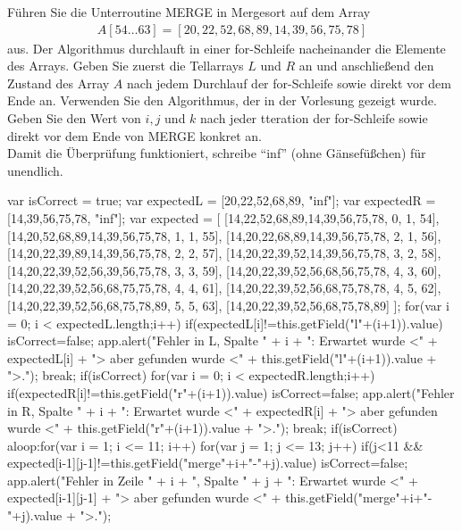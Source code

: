 \documentclass[a4paper,12pt]{article}
\begin{document}
\noindent Führen Sie die Unterroutine MERGE in Mergesort auf dem Array
\begin{align*}
    A[54 \ldots 63]=[20,22,52,68,89,14,39,56,75,78]
\end{align*}
aus. Der Algorithmus durchlauft in einer for-Schleife nacheinander die Elemente des Arrays. Geben Sie zuerst die
Tellarrays $L$ und $R$ an und anschließend den Zustand des Array $A$ nach jedem Durchlauf der for-Schleife sowie direkt
vor dem Ende an. Verwenden Sie den Algorithmus, der in der Vorlesung gezeigt wurde. Geben Sie den Wert von $i, j$
und $k$ nach jeder tteration der for-Schleife sowie direkt vor dem Ende von MERGE konkret an.\\
Damit die Überprüfung funktioniert, schreibe "`inf"' (ohne Gänsefüßchen) für unendlich.
\def\textfieldwidth{.8cm}
\begin{defineJS}{\aNiceScript}
    var isCorrect = true;
    var expectedL = [20,22,52,68,89, "inf"];
    var expectedR = [14,39,56,75,78, "inf"];
    var expected = [
        [14,22,52,68,89,14,39,56,75,78, 0, 1, 54],
        [14,20,52,68,89,14,39,56,75,78, 1, 1, 55],
        [14,20,22,68,89,14,39,56,75,78, 2, 1, 56],
        [14,20,22,39,89,14,39,56,75,78, 2, 2, 57],
        [14,20,22,39,52,14,39,56,75,78, 3, 2, 58],
        [14,20,22,39,52,56,39,56,75,78, 3, 3, 59],
        [14,20,22,39,52,56,68,56,75,78, 4, 3, 60],
        [14,20,22,39,52,56,68,75,75,78, 4, 4, 61],
        [14,20,22,39,52,56,68,75,78,78, 4, 5, 62],
        [14,20,22,39,52,56,68,75,78,89, 5, 5, 63],
        [14,20,22,39,52,56,68,75,78,89]
        ];
    for(var i = 0; i < expectedL.length;i++){
        if(expectedL[i]!=this.getField("l"+(i+1)).value) {
            isCorrect=false;
            app.alert("Fehler in L, Spalte " + i + ": Erwartet wurde <" + expectedL[i] + "> aber gefunden wurde <" + this.getField("l"+(i+1)).value + ">.");
            break;
        }
    }
    if(isCorrect){
        for(var i = 0; i < expectedR.length;i++){
            if(expectedR[i]!=this.getField("r"+(i+1)).value) {
                isCorrect=false;
                app.alert("Fehler in R, Spalte " + i + ": Erwartet wurde <" + expectedR[i] + "> aber gefunden wurde <" + this.getField("r"+(i+1)).value + ">.");
                break;
            }
        }
    }
    if(isCorrect){
        aloop:for(var i = 1; i <= 11; i++) {
            for(var j = 1; j <= 13; j++) {
                if(j<11 && expected[i-1][j-1]!=this.getField("merge"+i+"-"+j).value){
                    isCorrect=false;
                    app.alert("Fehler in Zeile " + i + ", Spalte " + j + ": Erwartet wurde <" + expected[i-1][j-1] + "> aber gefunden wurde <" + this.getField("merge"+i+"-"+j).value  +  ">.");
}}}}
\end{defineJS}
\end{document}
